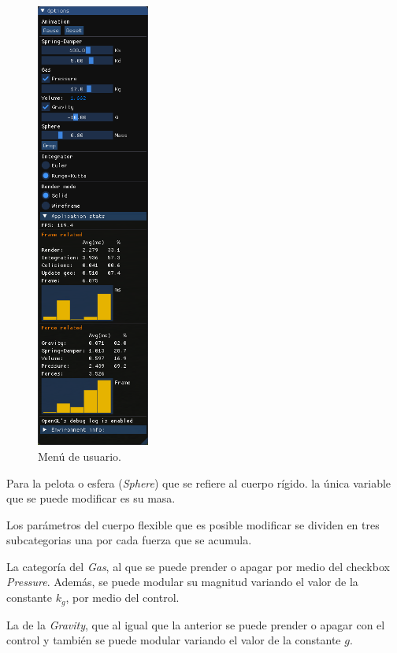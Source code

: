\begin{figure}
 \centering
 \includegraphics[width=0.33\textwidth]{img/04/menu}
 \caption[Menú de usuario del programa]{Menú de usuario.}
 \label{programa:menu}
\end{figure}

Para la pelota o esfera (\emph{\textenglish{Sphere}}) que se refiere al cuerpo rígido.
la única variable que se puede modificar es su masa.

Los parámetros del cuerpo flexible que es posible modificar se dividen en tres subcategorias una por cada fuerza que se acumula.

La categoría del \emph{Gas}, al que se puede prender o apagar por medio del checkbox \emph{\textenglish{Pressure}}. 
Además, se puede modular su magnitud variando el valor de la constante $k_{g}$, por medio del control.

La de la \emph{\textenglish{Gravity}}, que al igual que la anterior se puede prender o apagar con el control  y también se puede modular variando el valor de la constante $g$.

